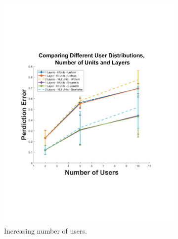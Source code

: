\documentclass[conference]{IEEEtran}
\begin{document}
	\begin{figure}
	\centering
	\begin{subfigure}[b]{0.45\textwidth}
		\includegraphics[width=\textwidth]{./img/users4}
		\caption{Increasing number of users.}
		\label{fig:user}
	\end{subfigure}
	~ %
	\begin{subfigure}[b]{0.45\textwidth}

\end{subfigure}
\end{figure}
\end{document}
